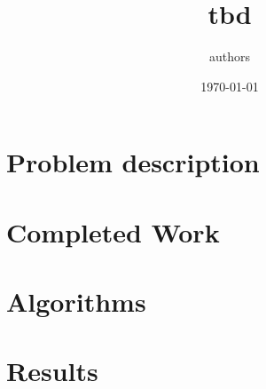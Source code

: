 \documentclass[a4paper]{article}
\title{tbd}
\author{authors}
\date{\today}
\begin{document}
\maketitle


\vspace{-3pt}
\section{Problem description}
\label{sec:introduction}


\section{Completed Work}

\section{Algorithms}


\section{Results}
\label{sec:results}

\end{document}
